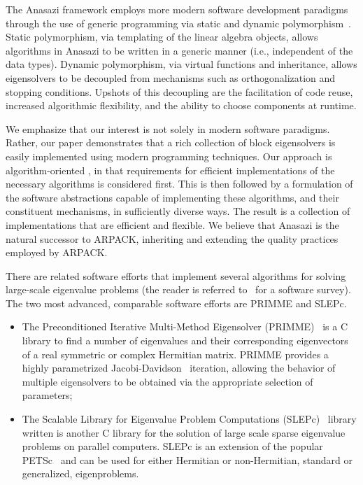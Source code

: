 \documentclass[acmtoms]{acmtrans2m}
\newcounter{algorithm}
\begin{document}
The Anasazi framework employs more modern software development paradigms through the use
of generic programming via static and dynamic polymorphism~\cite[Chapter 14]{VJ02}. Static
polymorphism, via templating of the linear algebra objects, allows algorithms in Anasazi
to be written in a generic manner (i.e., independent of the data types). Dynamic
polymorphism, via virtual functions and inheritance, allows eigensolvers to be decoupled
from mechanisms such as orthogonalization and stopping conditions. Upshots of this
decoupling are the facilitation of code reuse, increased algorithmic flexibility, and the
ability to choose components at runtime.

We emphasize that our interest is not solely in modern software paradigms. Rather, our
paper demonstrates that a rich collection of block eigensolvers is easily implemented
using modern programming techniques. Our approach is algorithm-oriented \cite{muov:94}, in
that requirements for efficient implementations of the necessary algorithms is considered
first. This is then followed by a formulation of the software abstractions capable of
implementing these algorithms, and their constituent mechanisms, in sufficiently diverse
ways. The result is a collection of implementations that are efficient and flexible. We
believe that Anasazi is the natural successor to ARPACK, inheriting and extending the
quality practices employed by ARPACK.

There are related software efforts that implement several algorithms for solving
large-scale eigenvalue problems (the reader is referred to~\cite{slepc:05}
for a software survey).  The two most advanced, comparable software efforts are PRIMME and
SLEPc.
\begin{itemize}
\item
The Preconditioned Iterative Multi-Method Eigensolver (PRIMME)~\cite{primme:06} is a C
library to find a number of eigenvalues and their corresponding eigenvectors of a real
symmetric or complex Hermitian matrix. PRIMME provides a highly parametrized
Jacobi-Davidson~\cite{slvo:96} iteration, allowing the behavior of multiple eigensolvers
to be obtained via the appropriate selection of parameters;
\item
The Scalable Library for Eigenvalue Problem Computations (SLEPc)~\cite{slepc:06} library
written is another C library for the solution of large scale sparse eigenvalue problems on parallel
computers. SLEPc is an extension of the popular PETSc~\cite{petsc-web-page} and can be
used for either Hermitian or non-Hermitian, standard or generalized, eigenproblems.
\end{itemize}
\end{document}
